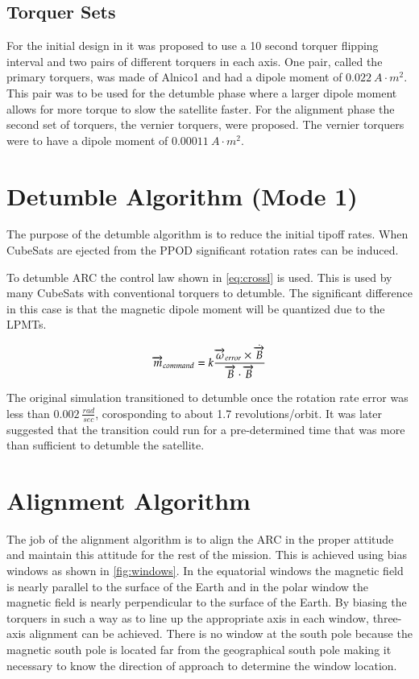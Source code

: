 \subsection{Torquer Sets}

For the initial design in \cite{Mentch11} it was proposed to use a 10 second torquer flipping interval and two pairs of different torquers in each axis. One pair, called the primary torquers, was made of Alnico1 and had a dipole moment of $0.022~\unit{A}{\cdot}\unit{m^2}$. This pair was to be used for the detumble phase where a larger dipole moment allows for more torque to slow the satellite faster. For the alignment phase the second set of torquers, the vernier torquers, were proposed. The vernier torquers were to have a dipole moment of $0.00011~\unit{A}{\cdot}\unit{m^2}$.

\section{Detumble Algorithm (Mode 1)}

The purpose of the detumble algorithm is to reduce the initial tipoff rates. When CubeSats are ejected from the \ac{PPOD} significant rotation rates can be induced.

To detumble \ac{ARC} the control law shown in \cref{eq:crossl} is used. This is used by many CubeSats with conventional torquers to detumble. The significant difference in this case is that the magnetic dipole moment will be quantized due to the \acp{LPMT}.

\begin{equation}
    \overrightarrow{m}_{command} = k {\frac{\overrightarrow{\omega}_{error} \times \dot{\overrightarrow{B}}}{\overrightarrow{B} \cdot \overrightarrow{B}}}
    \label{eq:crossl}
\end{equation}

The original simulation transitioned to detumble once the rotation rate error was less than $0.002~\unit{\frac{rad}{sec}}$, corosponding to about 1.7 revolutions/orbit. It was later suggested that the transition could run for a pre-determined time that was more than sufficient to detumble the satellite.

\section{Alignment Algorithm}

The job of the alignment algorithm is to align the \ac{ARC} in the proper attitude and maintain this attitude for the rest of the mission. This is achieved using bias windows as shown in \cref{fig:windows}. In the equatorial windows the magnetic field is nearly parallel to the surface of the Earth and in the polar window the magnetic field is nearly perpendicular to the surface of the Earth. By biasing the torquers in such a way as to line up the appropriate axis in each window, three-axis alignment can be achieved. There is no window at the south pole because the magnetic south pole is located far from the geographical south pole making it necessary to know the direction of approach to determine the window location.

